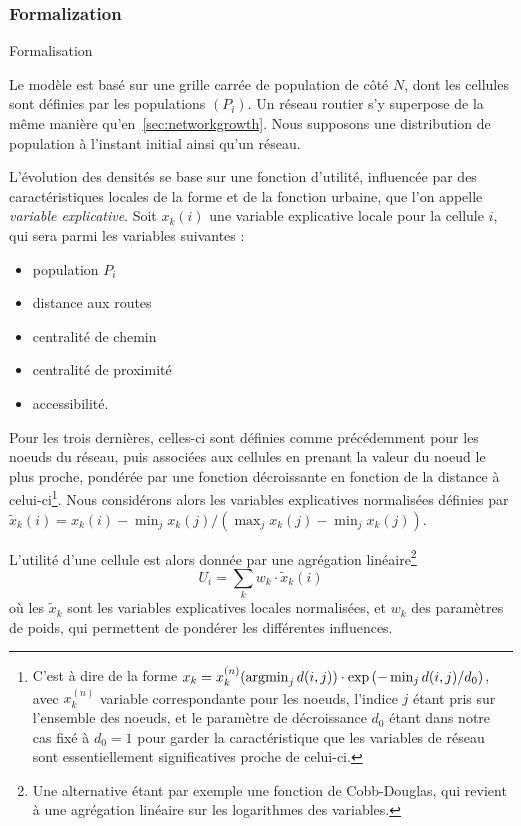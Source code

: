 \subsubsection{Formalization}{Formalisation}


Le modèle est basé sur une grille carrée de population de côté $N$, dont les cellules sont définies par les populations $(P_i)$. Un réseau routier s'y superpose de la même manière qu'en~\ref{sec:networkgrowth}. Nous supposons une distribution de population à l'instant initial ainsi qu'un réseau.


L'évolution des densités se base sur une fonction d'utilité, influencée par des caractéristiques locales de la forme et de la fonction urbaine, que l'on appelle \emph{variable explicative}. Soit $x_k(i)$ une variable explicative locale pour la cellule $i$, qui sera parmi les variables suivantes : 
\begin{itemize}
	\item population $P_i$
	\item distance aux routes
	\item centralité de chemin
	\item centralité de proximité
	\item accessibilité.
\end{itemize}
Pour les trois dernières, celles-ci sont définies comme précédemment pour les noeuds du réseau, puis associées aux cellules en prenant la valeur du noeud le plus proche, pondérée par une fonction décroissante en fonction de la distance à celui-ci\footnote{C'est à dire de la forme $x_k = x^{(n)}_k (\operatorname*{\arg\!\min}_j d(i,j)) \cdot \exp \left( -  \min_j d(i,j) / d_0 \right)$, avec $x^{(n)}_k$ variable correspondante pour les noeuds, l'indice $j$ étant pris sur l'ensemble des noeuds, et le paramètre de décroissance $d_0$ étant dans notre cas fixé à $d_0 = 1$ pour garder la caractéristique que les variables de réseau sont essentiellement significatives proche de celui-ci.}. Nous considérons alors les variables explicatives normalisées définies par $\tilde{x}_k(i) = x_k(i) - \min_j x_k(j) / (\max_j x_k(j) - \min_j x_k(j))$. 

L'utilité d'une cellule est alors donnée par une agrégation linéaire\footnote{Une alternative étant par exemple une fonction de Cobb-Douglas, qui revient à une agrégation linéaire sur les logarithmes des variables.}
\[
U_i = \sum_k w_k \cdot \tilde{x}_k(i)
\]
où les $\tilde{x}_k$ sont les variables explicatives locales normalisées, et $w_k$ des paramètres de poids, qui permettent de pondérer les différentes influences.


